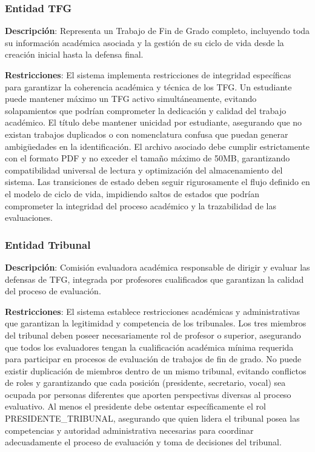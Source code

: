 \documentclass[12pt,a4paper,oneside]{report}
\begin{document}
\subsubsection{Entidad TFG}\label{entidad-tfg}

\textbf{Descripción}: Representa un Trabajo de Fin de Grado completo, incluyendo toda su información académica asociada y la gestión de su ciclo de vida desde la creación inicial hasta la defensa final.

\textbf{Restricciones}: El sistema implementa restricciones de integridad específicas para garantizar la coherencia académica y técnica de los TFG. Un estudiante puede mantener máximo un TFG activo simultáneamente, evitando solapamientos que podrían comprometer la dedicación y calidad del trabajo académico. El título debe mantener unicidad por estudiante, asegurando que no existan trabajos duplicados o con nomenclatura confusa que puedan generar ambigüedades en la identificación. El archivo asociado debe cumplir estrictamente con el formato PDF y no exceder el tamaño máximo de 50MB, garantizando compatibilidad universal de lectura y optimización del almacenamiento del sistema. Las transiciones de estado deben seguir rigurosamente el flujo definido en el modelo de ciclo de vida, impidiendo saltos de estados que podrían comprometer la integridad del proceso académico y la trazabilidad de las evaluaciones.

\subsubsection{Entidad Tribunal}\label{entidad-tribunal}

\textbf{Descripción}: Comisión evaluadora académica responsable de dirigir y evaluar las defensas de TFG, integrada por profesores cualificados que garantizan la calidad del proceso de evaluación.

\textbf{Restricciones}: El sistema establece restricciones académicas y administrativas que garantizan la legitimidad y competencia de los tribunales. Los tres miembros del tribunal deben poseer necesariamente rol de profesor o superior, asegurando que todos los evaluadores tengan la cualificación académica mínima requerida para participar en procesos de evaluación de trabajos de fin de grado. No puede existir duplicación de miembros dentro de un mismo tribunal, evitando conflictos de roles y garantizando que cada posición (presidente, secretario, vocal) sea ocupada por personas diferentes que aporten perspectivas diversas al proceso evaluativo. Al menos el presidente debe ostentar específicamente el rol PRESIDENTE\_TRIBUNAL, asegurando que quien lidera el tribunal posea las competencias y autoridad administrativa necesarias para coordinar adecuadamente el proceso de evaluación y toma de decisiones del tribunal.
\end{document}

